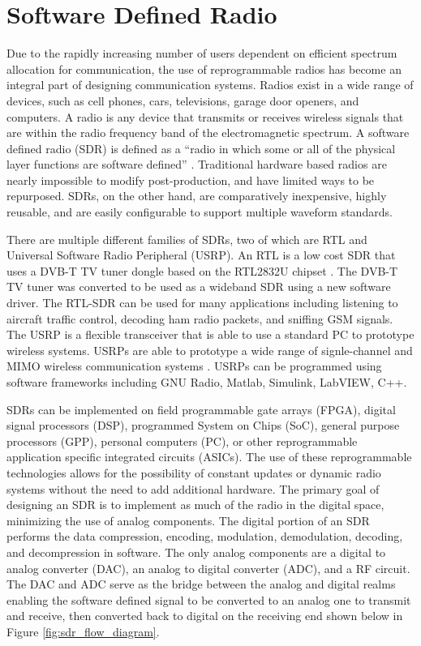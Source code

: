 \section{Software Defined Radio}
Due to the rapidly increasing number of users dependent on efficient spectrum allocation for communication, the use of reprogrammable radios has become an integral part of designing communication systems. Radios exist in a wide range of devices, such as cell phones, cars, televisions, garage door openers, and computers. A radio is any device that transmits or receives wireless signals that are within the radio frequency band of the electromagnetic spectrum. A software defined radio (SDR) is defined as a “radio in which some or all of the physical layer functions are software defined” \cite{sdr_forum}. Traditional hardware based radios are nearly impossible to modify post-production, and have limited ways to be repurposed. SDRs, on the other hand, are comparatively inexpensive, highly reusable, and are easily configurable to support multiple waveform standards.\par
There are multiple different families of SDRs, two of which are RTL and Universal Software Radio Peripheral (USRP). An RTL is a low cost SDR that uses a DVB-T TV tuner dongle based on the RTL2832U chipset \cite{rtl_sdr}. The DVB-T TV tuner was converted to be used as a wideband SDR using a new software driver. The RTL-SDR can be used for many applications including listening to aircraft traffic control, decoding ham radio packets, and sniffing GSM signals. The USRP is a flexible transceiver that is able to use a standard PC to prototype wireless systems. USRPs are able to prototype a wide range of signle-channel and MIMO wireless communication systems \cite{USRP_NI}. USRPs can be programmed using software frameworks including GNU Radio, Matlab, Simulink, LabVIEW, C++.\par
SDRs can be implemented on field programmable gate arrays (FPGA), digital signal processors (DSP), programmed System on Chips (SoC), general purpose processors (GPP), personal computers (PC), or other reprogrammable application specific integrated circuits (ASICs). The use of these reprogrammable technologies allows for the possibility of constant updates or dynamic radio systems without the need to add additional hardware. The primary goal of designing an SDR is to implement as much of the radio in the digital space, minimizing the use of analog components. The digital portion of an SDR performs the data compression, encoding, modulation, demodulation, decoding, and decompression in software. The only analog components are a digital to analog converter (DAC), an analog to digital converter (ADC), and a RF circuit. The DAC and ADC serve as the bridge between the analog and digital realms enabling the software defined signal to be converted to an analog one to transmit and receive, then converted back to digital on the receiving end shown below in Figure \ref{fig:sdr_flow_diagram}.
